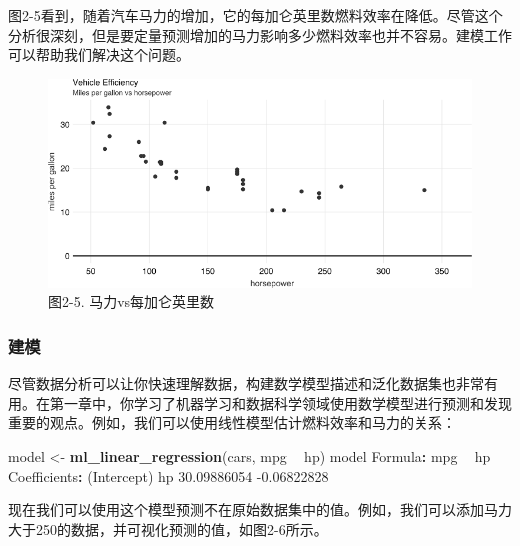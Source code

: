 \documentclass[
]{article}
\newenvironment{Shaded}{\begin{snugshade}}{\end{snugshade}}
\newcommand{\DataTypeTok}[1]{\textcolor[rgb]{0.13,0.29,0.53}{#1}}
\newcommand{\DecValTok}[1]{\textcolor[rgb]{0.00,0.00,0.81}{#1}}
\newcommand{\FloatTok}[1]{\textcolor[rgb]{0.00,0.00,0.81}{#1}}
\newcommand{\KeywordTok}[1]{\textcolor[rgb]{0.13,0.29,0.53}{\textbf{#1}}}
\newcommand{\NormalTok}[1]{#1}
\newcommand{\OperatorTok}[1]{\textcolor[rgb]{0.81,0.36,0.00}{\textbf{#1}}}
\newcommand{\StringTok}[1]{\textcolor[rgb]{0.31,0.60,0.02}{#1}}
\begin{document}
图2-5看到，随着汽车马力的增加，它的每加仑英里数燃料效率在降低。尽管这个分析很深刻，但是要定量预测增加的马力影响多少燃料效率也并不容易。建模工作可以帮助我们解决这个问题。

\begin{figure}
\centering
\includegraphics{figures/2_5.png}
\caption{图2-5. 马力vs每加仑英里数}
\end{figure}

\hypertarget{ux5efaux6a21}{%
\subsubsection{建模}\label{ux5efaux6a21}}

尽管数据分析可以让你快速理解数据，构建数学模型描述和泛化数据集也非常有用。在第一章中，你学习了机器学习和数据科学领域使用数学模型进行预测和发现重要的观点。例如，我们可以使用线性模型估计燃料效率和马力的关系：

\begin{Shaded}
\begin{Highlighting}[]
\NormalTok{model <-}\StringTok{ }\KeywordTok{ml_linear_regression}\NormalTok{(cars, mpg }\OperatorTok{~}\StringTok{ }\NormalTok{hp)}
\NormalTok{model}
\NormalTok{Formula}\OperatorTok{:}\StringTok{ }\NormalTok{mpg }\OperatorTok{~}\StringTok{ }\NormalTok{hp}
\NormalTok{Coefficients}\OperatorTok{:}
\NormalTok{(Intercept) hp}
\FloatTok{30.09886054} \FloatTok{-0.06822828}
\end{Highlighting}
\end{Shaded}

现在我们可以使用这个模型预测不在原始数据集中的值。例如，我们可以添加马力大于250的数据，并可视化预测的值，如图2-6所示。

\begin{Shaded}
\end{Shaded}
\end{document}
